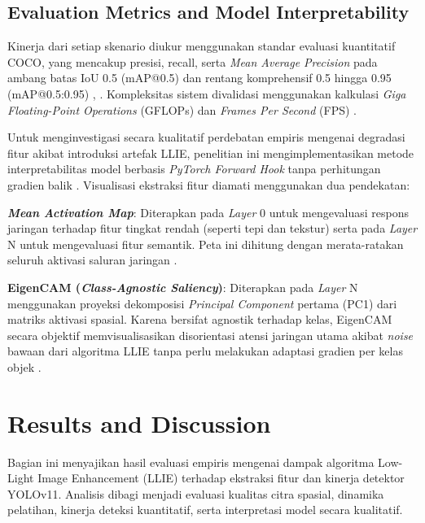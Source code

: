 ﻿\documentclass[conference]{IEEEtran}
\begin{document}
\subsection{Evaluation Metrics and Model Interpretability} Kinerja dari setiap skenario diukur menggunakan standar evaluasi kuantitatif COCO, yang mencakup presisi, recall, serta \textit{Mean Average Precision} pada ambang batas IoU 0.5 (mAP@0.5) dan rentang komprehensif 0.5 hingga 0.95 (mAP@0.5:0.95) \cite{report2026internal}, \cite{metrics2026formulas}. Kompleksitas sistem divalidasi menggunakan kalkulasi \textit{Giga Floating-Point Operations} (GFLOPs) dan \textit{Frames Per Second} (FPS) \cite{metrics2026formulas}.

Untuk menginvestigasi secara kualitatif perdebatan empiris mengenai degradasi fitur akibat introduksi artefak LLIE, penelitian ini mengimplementasikan metode interpretabilitas model berbasis \textit{PyTorch Forward Hook} tanpa perhitungan gradien balik \cite{metrics2026formulas}. Visualisasi ekstraksi fitur diamati menggunakan dua pendekatan:

\textbf{\textit{Mean Activation Map}}: Diterapkan pada \textit{Layer} 0 untuk mengevaluasi respons jaringan terhadap fitur tingkat rendah (seperti tepi dan tekstur) serta pada \textit{Layer} N untuk mengevaluasi fitur semantik. Peta ini dihitung dengan merata-ratakan seluruh aktivasi saluran jaringan \cite{metrics2026formulas}.

\textbf{EigenCAM (\textit{Class-Agnostic Saliency})}: Diterapkan pada \textit{Layer} N menggunakan proyeksi dekomposisi \textit{Principal Component} pertama (PC1) dari matriks aktivasi spasial. Karena bersifat agnostik terhadap kelas, EigenCAM secara objektif memvisualisasikan disorientasi atensi jaringan utama akibat \textit{noise} bawaan dari algoritma LLIE tanpa perlu melakukan adaptasi gradien per kelas objek \cite{metrics2026formulas}.


\section{Results and Discussion}
Bagian ini menyajikan hasil evaluasi empiris mengenai dampak algoritma Low-Light Image Enhancement (LLIE) terhadap ekstraksi fitur dan kinerja detektor YOLOv11. Analisis dibagi menjadi evaluasi kualitas citra spasial, dinamika pelatihan, kinerja deteksi kuantitatif, serta interpretasi model secara kualitatif.
\end{document}
